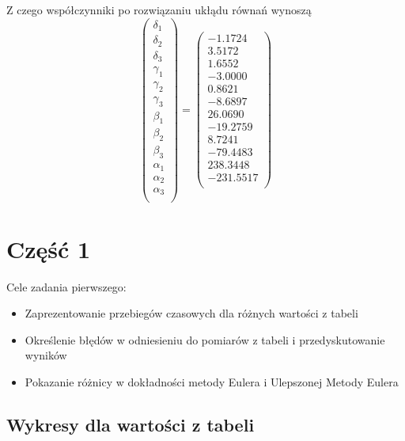\documentclass[varwidth,12pt,a4paper]{article}
\begin{document}
Z czego współczynniki po rozwiązaniu ukłądu równań wynoszą
$$
\left( \begin{array}{c}
\delta _1\\
\delta_2\\
\delta_3\\
\gamma _1\\
\gamma _2\\
\gamma_3\\
\beta _1\\
\beta _2\\
\beta _3\\
\alpha _1\\
\alpha _2\\
\alpha _3 \\
\end{array} \right) = \left( \begin{array}{c}
-1.1724 \\
3.5172 \\
1.6552 \\
-3.0000 \\
0.8621 \\
-8.6897 \\
26.0690 \\
-19.2759 \\
8.7241 \\
-79.4483 \\
238.3448 \\
-231.5517 \\
\end{array} \right) 
$$

\section{Część 1}

Cele zadania pierwszego:

\begin{itemize}
  \item Zaprezentowanie przebiegów czasowych dla różnych wartości z tabeli
  \item Określenie błędów w odniesieniu do pomiarów z tabeli i przedyskutowanie wyników
  \item Pokazanie różnicy w dokładności metody Eulera i Ulepszonej Metody Eulera
\end{itemize}

\subsection{Wykresy dla wartości z tabeli}
\end{document}
